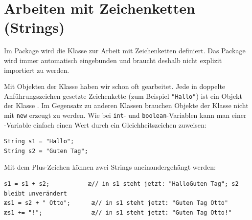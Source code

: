 \clearpage

\rehead[]{\textcolor{lightblue}{AvHG, Inf, My}}
\lohead[]{\textcolor{lightblue}{AvHG, Inf, My}}

\lstset{style=myJava}

\section{Arbeiten mit Zeichenketten (Strings)}


Im Package  wird die Klasse  zur Arbeit mit
Zeichenketten definiert. Das Package  wird immer
automatisch eingebunden und braucht deshalb nicht explizit importiert zu
werden.

Mit Objekten der Klasse  haben wir schon oft gearbeitet. Jede in
doppelte Anführungszeichen gesetzte Zeichenkette (zum Beispiel \texttt{"Hallo"}) ist ein
Objekt der Klasse . Im Gegensatz zu anderen Klassen brauchen
Objekte der Klasse  nicht mit \lstinline|new| erzeugt zu
werden. Wie bei \lstinline|int|- und \lstinline|boolean|-Variablen kann man
einer -Variable einfach einen Wert durch ein
Gleichheitszeichen zuweisen:

\begin{lstlisting}
String s1 = "Hallo";
String s2 = "Guten Tag";
\end{lstlisting}

Mit dem Plus-Zeichen können zwei Strings aneinandergehängt werden:

\begin{lstlisting} 
s1 = s1 + s2;           æ// in s1 steht jetzt: "HalloGuten Tag"; s2 bleibt unverändert 
æs1 = s2 + " Otto";      æ// in s1 steht jetzt: "Guten Tag Otto"
æs1 += "!";              æ// in s1 steht jetzt: "Guten Tag Otto!"
\end{lstlisting}

